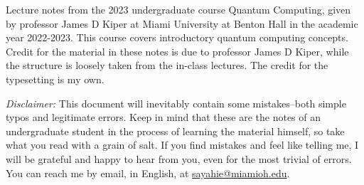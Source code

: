 Lecture notes from the 2023 undergraduate course Quantum Computing, given by professor
James D Kiper at Miami University at Benton Hall in the academic year 2022-2023. This
course covers introductory quantum computing concepts. Credit for the material in these notes is due to professor James D Kiper, while the structure is loosely taken from the in-class lectures. The credit for the typesetting is my own.

\textit{Disclaimer:} This document will inevitably contain some mistakes–both
simple typos and legitimate errors. Keep in mind that these are the notes of an
undergraduate student in the process of learning the material himself, so take
what you read with a grain of salt. If you find mistakes and feel like telling
me, I will be grateful and happy to hear from you, even for the most trivial of
errors. You can reach me by email, in English, at
\href{mailto:sayahie@miamioh.edu}{sayahie@miamioh.edu}.